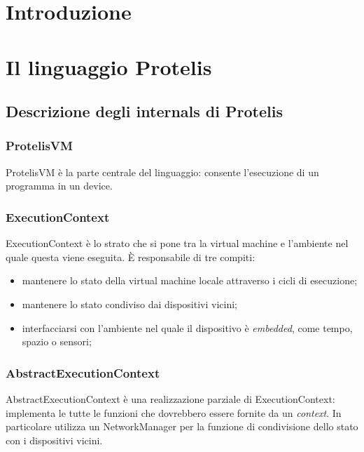 \documentclass{article}
\begin{document}
\section{Introduzione}



\section{Il linguaggio Protelis}

\subsection{Descrizione degli internals di Protelis}

\subsubsection{ProtelisVM}

ProtelisVM è la parte centrale del linguaggio: consente l'esecuzione di un programma in un device.

\subsubsection{ExecutionContext}

ExecutionContext è lo strato che si pone tra la virtual machine e l'ambiente nel quale questa viene eseguita. È responsabile di tre compiti:

\begin{itemize}
    \item{mantenere lo stato della virtual machine locale attraverso i cicli di esecuzione;}

    \item{mantenere lo stato condiviso dai dispositivi vicini;}

    \item{interfacciarsi con l'ambiente nel quale il dispositivo è \textit{embedded}, come tempo, spazio o sensori;}
\end{itemize}

\subsubsection{AbstractExecutionContext}

AbstractExecutionContext è una realizzazione parziale di ExecutionContext: implementa le tutte le funzioni che dovrebbero essere fornite da un \textit{context}. In particolare utilizza un NetworkManager per la funzione di condivisione dello stato con i dispositivi vicini.
\end{document}
